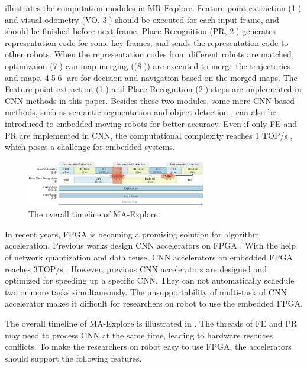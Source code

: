  illustrates the computation modules in MR-Explore. Feature-point extraction (\textcircled{1}) and visual odometry (VO, \textcircled{3}) should be executed for each input frame, and should be finished before next frame. 
Place Recognition (PR, \textcircled{2}) generates representation code for some key frames, and sends the representation code to other robots. 
When the  representation codes from different robots are matched, optimizaion (\textcircled{7}) can map merging ((\textcircled{8})) are executed to merge the trajectories and maps. \textcircled{4}\textcircled{5}\textcircled{6} are for decision and navigation based on the merged maps. 
The Feature-point extraction (\textcircled{1}) and  Place Recognition (\textcircled{2}) steps are implemented in CNN methods in this paper.
Besides these two modules, some more CNN-based methods, such as semantic segmentation \cite{long2015fully} and object detection \cite{ren2015faster}, can also be introduced to embedded moving robots for better accuracy.
Even if only FE and PR are implemented in CNN, the computational complexity reaches 1 TOP/s , which poses a challenge for embedded systems.


\begin{figure}[t]
    \centering
	\includegraphics[width=0.7\textwidth]{fig/overalltime.eps} 	
    \caption{
    The overall timeline of MA-Explore.
    }
	\label{fig:overalltime}
\end{figure}


In recent years, FPGA is becoming a promising solution for algorithm acceleration. Previous works design CNN accelerators on FPGA \cite{yu2018instruction,li_high_2016,qiu2016going,lu_evaluating_2017}. With the help of network quantization and data reuse, CNN accelerators on embedded FPGA reaches 3TOP/s \cite{lu_evaluating_2017}. However, previous CNN accelerators are designed and optimized for speeding up a specific CNN. They can not automatically schedule two or more tasks simultaneously. 
The unsupportability of multi-task of CNN accelerator makes it difficult for researchers on robot to use the embedded FPGA.



The overall timeline of MA-Explore is illustrated in . The threads of FE and PR may need to process CNN at the same time, leading to hardware resouces conflicts. To make the researchers on robot easy to use FPGA, the accelerators should support the following features.

